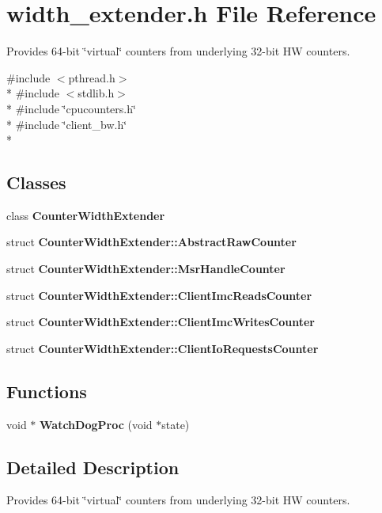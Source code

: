 \section{width\+\_\+extender.\+h File Reference}
\label{width__extender_8h}


Provides 64-\/bit \char`\"{}virtual\char`\"{} counters from underlying 32-\/bit H\+W counters.  


{\ttfamily \#include $<$pthread.\+h$>$}\\*
{\ttfamily \#include $<$stdlib.\+h$>$}\\*
{\ttfamily \#include \char`\"{}cpucounters.\+h\char`\"{}}\\*
{\ttfamily \#include \char`\"{}client\+\_\+bw.\+h\char`\"{}}\\*
\subsection*{Classes}
\begin{DoxyCompactItemize}
\item 
class {\bf Counter\+Width\+Extender}
\item 
struct {\bf Counter\+Width\+Extender\+::\+Abstract\+Raw\+Counter}
\item 
struct {\bf Counter\+Width\+Extender\+::\+Msr\+Handle\+Counter}
\item 
struct {\bf Counter\+Width\+Extender\+::\+Client\+Imc\+Reads\+Counter}
\item 
struct {\bf Counter\+Width\+Extender\+::\+Client\+Imc\+Writes\+Counter}
\item 
struct {\bf Counter\+Width\+Extender\+::\+Client\+Io\+Requests\+Counter}
\end{DoxyCompactItemize}
\subsection*{Functions}
\begin{DoxyCompactItemize}
\item 
void $\ast$ {\bfseries Watch\+Dog\+Proc} (void $\ast$state)\label{width__extender_8h_a13b3112e6cc7354fd6fb7c7605c781f4}

\end{DoxyCompactItemize}


\subsection{Detailed Description}
Provides 64-\/bit \char`\"{}virtual\char`\"{} counters from underlying 32-\/bit H\+W counters. 

